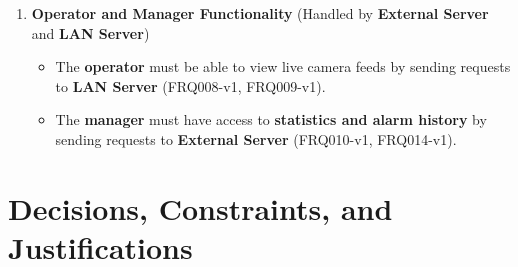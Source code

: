 \documentclass{article}
\begin{document}
\begin{enumerate}
    \item \textbf{Operator and Manager Functionality} (Handled by \textbf{External Server} and \textbf{LAN Server})
    \begin{itemize}
        \item The \textbf{operator} must be able to view live camera feeds by sending requests to \textbf{LAN Server} (FRQ008-v1, FRQ009-v1).
        \item The \textbf{manager} must have access to \textbf{statistics and alarm history} by sending requests to \textbf{External Server} (FRQ010-v1, FRQ014-v1).
    \end{itemize}
\end{enumerate}

\section{Decisions, Constraints, and Justifications}
\end{document}
